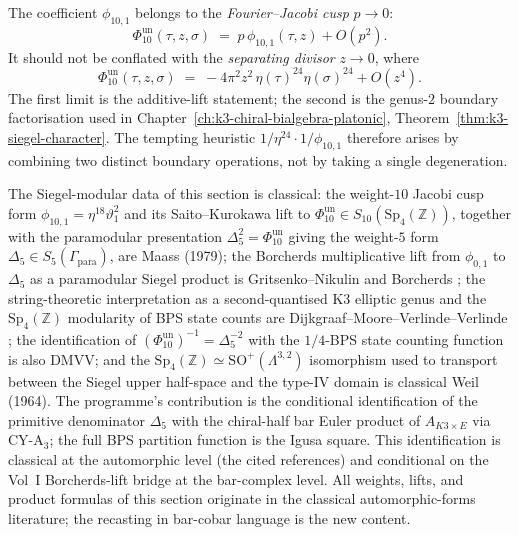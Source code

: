 \begin{remark}
\label{rem:k3e-fj-vs-separating}
The coefficient $\phi_{10,1}$ belongs to the \emph{Fourier--Jacobi cusp} $p\to 0$:
\[
 \Phi_{10}^{\mathrm{un}}(\tau,z,\sigma)
 \;=\;
 p\,\phi_{10,1}(\tau,z) + O(p^2).
\]
It should not be conflated with the \emph{separating divisor} $z\to 0$, where
\[
 \Phi_{10}^{\mathrm{un}}(\tau,z,\sigma)
 \;=\;
 -4\pi^2 z^2\,\eta(\tau)^{24}\eta(\sigma)^{24} + O(z^4).
\]
The first limit is the additive-lift statement; the second is the genus-$2$ boundary
factorisation used in Chapter~\ref{ch:k3-chiral-bialgebra-platonic},
Theorem~\ref{thm:k3-siegel-character}. The tempting heuristic
$1/\eta^{24}\cdot 1/\phi_{10,1}$ therefore arises by combining two distinct boundary
operations, not by taking a single degeneration.
\end{remark}

\begin{remark}
\label{rem:k3e-siegel-classical-origins}
The Siegel-modular data of this section is classical: the
weight-$10$ Jacobi cusp form $\phi_{10,1} = \eta^{18} \vartheta_1^2$ and
its Saito--Kurokawa lift to \(\Phi_{10}^{\mathrm{un}} \in S_{10}(\mathrm{Sp}_4(\mathbb{Z}))\), together with the paramodular presentation \(\Delta_5^2=\Phi_{10}^{\mathrm{un}}\) giving the weight-$5$ form $\Delta_5 \in S_5(\Gamma_{\mathrm{para}})$,
are Maass (1979); the Borcherds multiplicative lift from $\phi_{0,1}$ to
$\Delta_5$ as a paramodular Siegel product is Gritsenko--Nikulin
\cite{GritsenkoNikulin1995,GritsenkoNikulin1998} and Borcherds
\cite{Borcherds1998}; the string-theoretic interpretation as a
second-quantised K3 elliptic genus and the $\mathrm{Sp}_4(\mathbb{Z})$
modularity of BPS state counts are Dijkgraaf--Moore--Verlinde--Verlinde
\cite{DMVV}; the identification of
\((\Phi_{10}^{\mathrm{un}})^{-1}=\Delta_5^{-2}\) with the
\(1/4\)-BPS state counting function is also
DMVV; and the $\mathrm{Sp}_4(\mathbb{Z})
\simeq \mathrm{SO}^+(\Lambda^{3,2})$ isomorphism used to transport
between the Siegel upper half-space and the type-IV domain is classical
Weil (1964). The programme's contribution is the conditional
identification of the primitive denominator $\Delta_5$ with the
chiral-half bar Euler product of $A_{K3 \times E}$ via CY-A$_3$; the
full BPS partition function is the Igusa square. This identification is
classical at the automorphic level (the cited references) and
conditional on the Vol~I Borcherds-lift bridge at the bar-complex level.
All weights, lifts, and product formulas of this section originate in
the classical automorphic-forms literature; the recasting in bar-cobar
language is the new content.
\end{remark}


